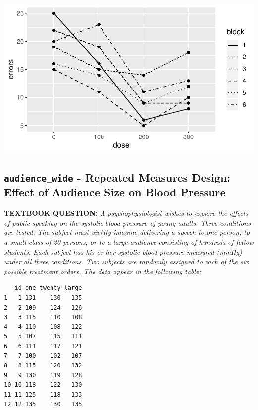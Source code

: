 \documentclass[
]{article}
\begin{document}
\begin{center}\includegraphics{Chapter-15-Assignment-R-Skeleton--2020spring_files/figure-latex/unnamed-chunk-6-1} \end{center}

\clearpage

\hypertarget{audience_wide---repeated-measures-design-effect-of-audience-size-on-blood-pressure}{%
\subsection{\texorpdfstring{\texttt{audience\_wide} - Repeated Measures
Design: Effect of Audience Size on Blood
Pressure}{audience\_wide - Repeated Measures Design: Effect of Audience Size on Blood Pressure}}\label{audience_wide---repeated-measures-design-effect-of-audience-size-on-blood-pressure}}

\textbf{TEXTBOOK QUESTION:} \emph{A psychophysiologist wishes to explore
the effects of public speaking on the systolic blood pressure of young
adults. Three conditions are tested. The subject must vividly imagine
delivering a speech to one person, to a small class of 20 persons, or to
a large audience consisting of hundreds of fellow students. Each subject
has his or her systolic blood pressure measured (mmHg) under all three
conditions. Two subjects are randomly assigned to each of the six
possible treatment orders. The data appear in the following table:}

\begin{verbatim}
   id one twenty large
1   1 131    130   135
2   2 109    124   126
3   3 115    110   108
4   4 110    108   122
5   5 107    115   111
6   6 111    117   121
7   7 100    102   107
8   8 115    120   132
9   9 130    119   128
10 10 118    122   130
11 11 125    118   133
12 12 135    130   135
\end{verbatim}
\end{document}
